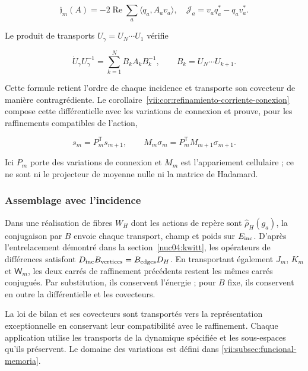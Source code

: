 \[
\mathfrak j_m(A)=-2\operatorname{Re}\sum_a\langle q_a,A_av_a\rangle,
\quad \mathcal J_a=v_aq_a^*-q_av_a^*.
\]

Le produit de transports \(U_\gamma=U_N\cdots U_1\) vérifie

\[
\dot U_\gamma U_\gamma^{-1}
=\sum_{k=1}^N B_kA_kB_k^{-1},\qquad B_k=U_N\cdots U_{k+1}.
\]

Cette formule retient l’ordre de chaque incidence et transporte son covecteur de manière contragrédiente. Le corollaire~\ref{vii:cor:refinamiento-corriente-conexion} compose cette différentielle avec les variations de connexion et prouve, pour les raffinements compatibles de l’action,

\[
s_m=P_m^{\mathsf T}s_{m+1},\qquad
M_m\sigma_m=P_m^{\mathsf T}M_{m+1}\sigma_{m+1}.
\]

Ici \(P_m\) porte des variations de connexion et \(M_m\) est l’appariement cellulaire ; ce ne sont ni le projecteur de moyenne nulle ni la matrice de Hadamard.

\subsubsection{Assemblage avec l’incidence
}

Dans une réalisation de fibres \(W_H\) dont les actions de repère sont \(\widehat\rho_H(g_a)\), la conjugaison par \(B\) envoie chaque transport, champ et poids sur \(E_{\rm inc}\). D’après l’entrelacement démontré dans la section~\ref{nuc04:kwitt}, les opérateurs de différences satisfont \(D_{\rm inc}B_{\rm vertices}=B_{\rm edges}D_H\). En transportant également \(J_m\), \(K_m\) et \(\mathsf W_m\), les deux carrés de raffinement précédents restent les mêmes carrés conjugués. Par substitution, ils conservent l’énergie ; pour \(B\) fixe, ils conservent en outre la différentielle et les covecteurs.


La loi de bilan et ses covecteurs sont transportés vers la représentation exceptionnelle en conservant leur compatibilité avec le raffinement. Chaque application utilise les transports de la dynamique spécifiée et les sous-espaces qu’ils préservent. Le domaine des variations est défini dans \cref{vii:subsec:funcional-memoria}.
